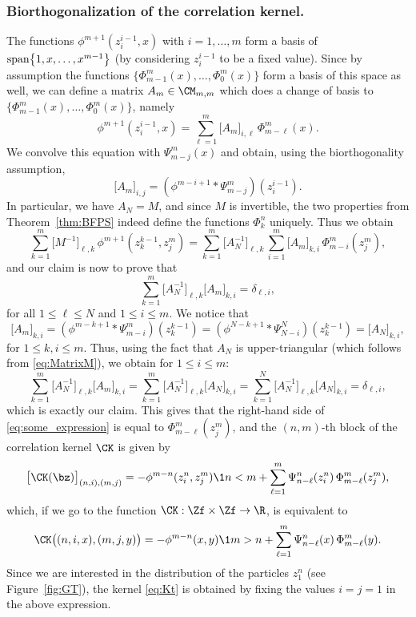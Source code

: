 \documentclass[]{pcmi}
\theoremstyle{plain}
\theoremstyle{definition}
\begin{document}
\subsubsection*{Biorthogonalization of the correlation kernel.} The functions $\phi^{m + 1}(z_i^{i-1},x)$ with $i =1, \ldots, m$ form a basis of ${\rm span}\bigl\{1,x,\ldots,x^{m-1}\bigr\}$ (by considering $z_i^{i-1}$ to be a fixed value). Since by assumption the functions $\bigl\{\Phi^m_{m-1}(x),\ldots,\Phi^m_0(x)\bigr\}$ form a basis of this space as well, we can define a matrix $A_m \in \CM_{m, m}$ which does a change of basis to $\bigl\{\Phi^m_{m-1}(x),\ldots,\Phi^m_0(x)\bigl\}$, namely
\[
	\phi^{m + 1}(z_i^{i-1},x)=\sum_{\ell=1}^m \bigl[A_m\bigr]_{i,\ell}\, \Phi^m_{m-\ell}(x).
\]
We convolve this equation with $\Psi^m_{m-j}(x)$ and obtain, using the biorthogonality assumption,
\[
\bigl[A_m\bigr]_{i,j}= \left (\phi^{m  - i + 1}*\Psi^m_{m-j}\right)(z_i^{i-1}).
\]
In particular, we have $A_N=M$, and since $M$ is invertible, the two properties from Theorem~\ref{thm:BFPS} indeed define the functions $\Phi^n_k$ uniquely. Thus we obtain
\begin{equation}\label{eq:some_expression}
\sum_{k=1}^m \bigl[M^{-1}\bigr]_{\ell, k}\, \phi^{m + 1}(z_k^{k-1},z_j^m) = \sum_{k=1}^m \bigl[A_N^{-1}\bigr]_{\ell, k}\, \sum_{i=1}^m \bigl[A_m\bigr]_{k,i}\, \Phi^m_{m-i}(z_j^m),
\end{equation}
and our claim is now to prove that 
\begin{equation}\label{eq:AOrth}
 \sum_{k=1}^m \bigl[A_N^{-1}\bigr]_{\ell, k} \bigl[A_m\bigr]_{k,i} = \delta_{\ell, i},
\end{equation}
for all $1 \leq \ell \leq N$ and $1 \leq i \leq m$. We notice that 
\[
\bigl[A_m\bigr]_{k, i}= \left (\phi^{m  - k + 1}*\Psi^m_{m-i}\right)(z_k^{k-1}) = \left (\phi^{N - k + 1}*\Psi^N_{N-i}\right)(z_k^{k-1}) = \bigl[A_N\bigr]_{k, i},
\]
for $1 \leq k, i \leq m$. Thus, using the fact that $A_N$ is upper-triangular (which follows from \eqref{eq:MatrixM}), we obtain for $1 \leq i \leq m$:
\[
 \sum_{k=1}^m \bigl[A_N^{-1}\bigr]_{\ell, k} \bigl[A_m\bigr]_{k,i} = \sum_{k=1}^m \bigl[A_N^{-1}\bigr]_{\ell, k} \bigl[A_N\bigr]_{k,i} = \sum_{k=1}^N \bigl[A_N^{-1}\bigr]_{\ell, k} \bigl[A_N\bigr]_{k,i} = \delta_{\ell, i},
\] 
which is exactly our claim. This gives that the right-hand side of \eqref{eq:some_expression} is equal to $\Phi^m_{m-\ell}(z_j^m)$, and the $(n,m)$-th block of the correlation kernel $\CK$ is given by
\[
 \bigl[\CK(\bz)\bigr]_{(n, i), (m, j)} = - \phi^{m - n}(z_i^n,z_j^{m}) \1{n < m} + \sum_{\ell = 1}^m \Psi^{n}_{n-\ell}(z_i^n)\, \Phi^m_{m-\ell}(z_j^m),
\]
which, if we go to the function $\CK : \Zf \times \Zf \to \R$, is equivalent to 
\[
\CK \bigl((n, i, x), (m, j, y)\bigr)=-\phi^{m - n}(x,y) \1{m > n} + \sum_{\ell = 1}^m\Psi^{n}_{n-\ell}(x)\, \Phi^{m}_{m-\ell}(y).
\]
Since we are interested in the distribution of the particles $z^n_1$ (see Figure~\ref{fig:GT}), the kernel \eqref{eq:Kt} is obtained by fixing the values $i = j = 1$ in the above expression.
\end{document}
